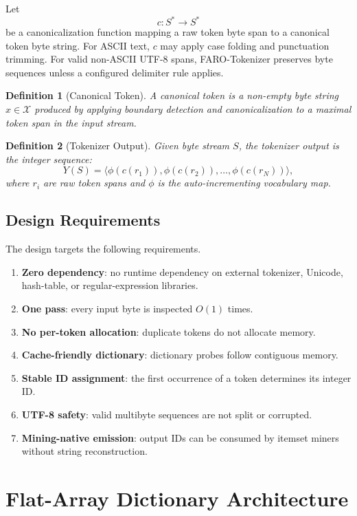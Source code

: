 \documentclass[11pt,a4paper]{article}
\newtheorem{definition}{Definition}
\newcommand{\Tokens}{\mathcal{X}}
\begin{document}
Let
\[
c:S^* \rightarrow S^*
\]
be a canonicalization function mapping a raw token byte span to a canonical token byte string. For ASCII text, \(c\) may apply case folding and punctuation trimming. For valid non-ASCII UTF-8 spans, FARO-Tokenizer preserves byte sequences unless a configured delimiter rule applies.

\begin{definition}[Canonical Token]
A canonical token is a non-empty byte string \(x\in\Tokens\) produced by applying boundary detection and canonicalization to a maximal token span in the input stream.
\end{definition}

\begin{definition}[Tokenizer Output]
Given byte stream \(S\), the tokenizer output is the integer sequence:
\[
Y(S)=\langle \phi(c(r_1)),\phi(c(r_2)),\dots,\phi(c(r_N))\rangle,
\]
where \(r_i\) are raw token spans and \(\phi\) is the auto-incrementing vocabulary map.
\end{definition}

\subsection{Design Requirements}

The design targets the following requirements.

\begin{enumerate}[label=(R\arabic*)]
\item \textbf{Zero dependency}: no runtime dependency on external tokenizer, Unicode, hash-table, or regular-expression libraries.
\item \textbf{One pass}: every input byte is inspected \(O(1)\) times.
\item \textbf{No per-token allocation}: duplicate tokens do not allocate memory.
\item \textbf{Cache-friendly dictionary}: dictionary probes follow contiguous memory.
\item \textbf{Stable ID assignment}: the first occurrence of a token determines its integer ID.
\item \textbf{UTF-8 safety}: valid multibyte sequences are not split or corrupted.
\item \textbf{Mining-native emission}: output IDs can be consumed by itemset miners without string reconstruction.
\end{enumerate}

\section{Flat-Array Dictionary Architecture}
\end{document}
